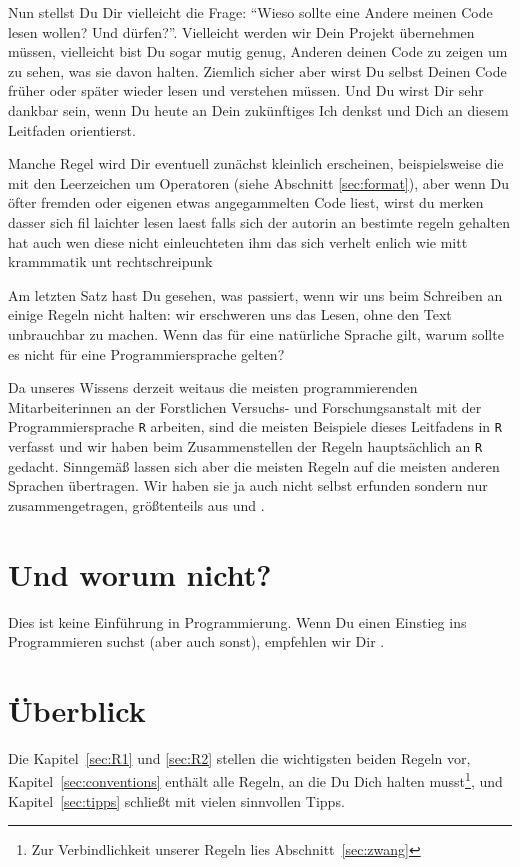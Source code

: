\documentclass[twoside]{scrreprt}
\providecommand{\R}{\texttt{R}}
\providecommand{\FVA}[1]{Forstliche#1 Versuchs- und Forschungs\-anstalt}
\begin{document}
Nun stellst Du Dir vielleicht die Frage: "`Wieso sollte eine Andere meinen Code
lesen wollen? Und d\"u{}rfen?"'. Vielleicht werden wir Dein Projekt
\"u{}bernehmen m\"u{}ssen, vielleicht bist Du sogar mutig genug, Anderen
deinen Code zu zeigen um zu sehen, was sie davon halten.
Ziemlich sicher aber wirst
Du selbst Deinen Code fr\"u{}her oder sp\"a{}ter wieder lesen und verstehen
m\"u{}ssen. Und Du wirst Dir sehr dankbar sein, wenn Du heute an Dein
zuk\"u{}nftiges Ich denkst und Dich an diesem Leitfaden orientierst.

Manche Regel wird Dir eventuell zun\"a{}chst kleinlich erscheinen,
beispielsweise die mit den Leerzeichen  um  Operatoren (siehe Abschnitt
\ref{sec:format}), aber wenn Du \"o{}fter fremden oder eigenen etwas
angegammelten Code liest, wirst
du merken dasser sich fil laichter lesen laest falls sich der autorin an
bestimte regeln gehalten hat auch wen diese nicht einleuchteten ihm das
sich verhelt enlich wie mitt krammmatik unt rechtschreipunk

Am letzten Satz hast Du gesehen, was passiert, wenn wir uns beim Schreiben an
einige Regeln nicht halten: wir erschweren uns das Lesen, ohne den Text
unbrauchbar zu machen. Wenn das f\"u{}r eine nat\"u{}rliche Sprache gilt, warum
sollte es nicht f\"u{}r eine Programmiersprache gelten?

Da unseres Wissens derzeit weitaus die meisten programmierenden Mitarbeiterinnen
an der \FVA{n} mit der Programmiersprache \R{} arbeiten, sind die
meisten Beispiele dieses Leitfadens in \R{} verfasst und wir haben beim
Zusammenstellen der Regeln haupts\"a{}chlich an \R{} gedacht.
Sinngem\"a{}\ss{} lassen sich aber die meisten Regeln auf die meisten
anderen Sprachen \"u{}bertragen. Wir haben sie ja auch nicht selbst erfunden
sondern nur zusammengetragen, gr\"o{}\ss{}tenteils aus \cite{cc} und \cite{wsp}.

\section{Und worum nicht?} Dies ist keine Einf\"u{}hrung in Programmierung.
Wenn Du einen Einstieg ins Programmieren suchst (aber auch sonst), empfehlen wir
Dir \cite{headfirst}.
\section{\"U{}berblick}
Die Kapitel~\ref{sec:R1} und \ref{sec:R2} stellen die wichtigsten beiden Regeln
vor, Kapitel~\ref{sec:conventions} enth\"a{}lt alle Regeln, an die Du Dich
halten musst\footnote{
  Zur Verbindlichkeit unserer Regeln lies Abschnitt~\ref{sec:zwang}
}, und Kapitel~\ref{sec:tipps} schlie\ss{}t mit vielen sinnvollen Tipps.
\end{document}
